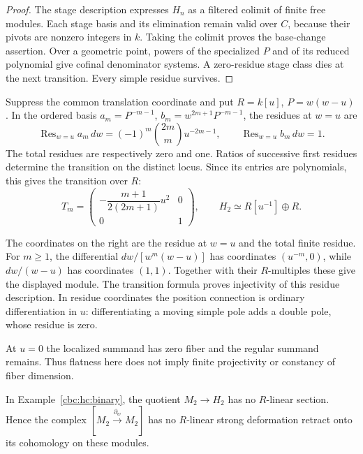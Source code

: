 \begin{proof}
The stage description expresses $H_n$ as a filtered colimit of
finite free modules. Each stage basis and its elimination remain
valid over $C$, because their pivots are nonzero integers in $k$.
Taking the colimit proves the base-change assertion. Over a
geometric point, powers of the specialized $P$ and of its reduced
polynomial give cofinal denominator systems. A zero-residue stage
class dies at the next transition. Every simple residue survives.
\end{proof}

\begin{example}\label{cbc:hc:binary}
Suppress the common translation coordinate and put
$R=k[u]$, $P=w(w-u)$. In the ordered basis
$a_m=P^{-m-1}$, $b_m=w^{2m+1}P^{-m-1}$, the residues at
$w=u$ are
\[
 \operatorname{Res}_{w=u}a_m\,dw
   =(-1)^m\binom{2m}{m}u^{-2m-1},\qquad
 \operatorname{Res}_{w=u}b_m\,dw=1.
\]
The total residues are respectively zero and one. Ratios of
successive first residues determine the transition on the
distinct locus. Since its entries are polynomials, this gives
the transition over $R$:
\begin{equation}\label{cbc:hc:binary-transition}
 T_m=\begin{pmatrix}
 -\dfrac{m+1}{2(2m+1)}u^2&0\\[3pt]0&1
 \end{pmatrix},\qquad
 H_2\simeq R[u^{-1}]\oplus R.
\end{equation}

The coordinates on the right are the residue at $w=u$ and
the total finite residue. For $m\geq1$, the differential
$dw/[w^m(w-u)]$ has coordinates $(u^{-m},0)$, while
$dw/(w-u)$ has coordinates $(1,1)$. Together with their
$R$-multiples these give the displayed module. The transition
formula proves injectivity of this residue description.
In residue coordinates the position connection is ordinary
differentiation in $u$: differentiating a moving simple pole
adds a double pole, whose residue is zero.

At $u=0$ the localized summand has zero fiber and the regular
summand remains. Thus flatness here does not imply finite
projectivity or constancy of fiber dimension.
\end{example}

\begin{proposition}\label{cbc:hc:no-section}
In Example~\ref{cbc:hc:binary}, the quotient $M_2\to H_2$
has no $R$-linear section. Hence the complex
$[M_2\xrightarrow{\partial_w}M_2]$ has no $R$-linear strong
deformation retract onto its cohomology on these modules.
\end{proposition}

